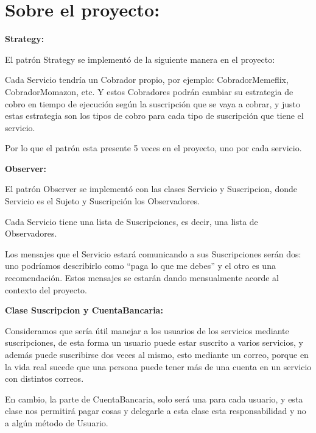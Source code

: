 \documentclass{article}
\begin{document}
\section*{Sobre el proyecto:}

\textbf{Strategy:}

El patrón Strategy se implementó de la siguiente manera en el proyecto:

Cada Servicio tendría un Cobrador propio, por ejemplo: CobradorMemeflix, CobradorMomazon, etc. Y estos Cobradores podrán cambiar su estrategia de cobro en tiempo de ejecución según la suscripción que se vaya a cobrar, y justo estas estrategia son los tipos de cobro para cada tipo de suscripción que tiene el servicio.

Por lo que el patrón esta presente 5 veces en el proyecto, uno por cada servicio.

\textbf{Observer:}

El patrón Observer se implementó con las clases Servicio y Suscripcion, donde Servicio es el Sujeto y Suscripción los Observadores.

Cada Servicio tiene una lista de Suscripciones, es decir, una lista de Observadores.

Los mensajes que el Servicio estará comunicando a sus Suscripciones serán dos: uno podríamos describirlo como “paga lo que me debes” y el otro es una recomendación. Estos mensajes se estarán dando mensualmente acorde al contexto del proyecto.

\textbf{Clase Suscripcion y CuentaBancaria:}

Consideramos que sería útil manejar a los usuarios de los servicios mediante suscripciones, de esta forma un usuario puede estar suscrito a varios servicios, y además puede suscribirse dos veces al mismo, esto mediante un correo, porque en la vida real sucede que una persona puede tener más de una cuenta en un servicio con distintos correos.

En cambio, la parte de CuentaBancaria, solo será una para cada usuario, y esta clase nos permitirá pagar cosas y delegarle a esta clase esta responsabilidad y no a algún método de Usuario.
\end{document}
